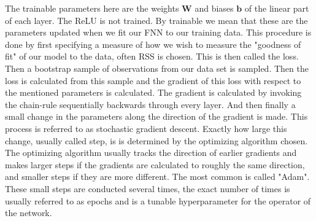 \documentclass[nofootinbib,UKenglish,nobalancelastpage,12pt]{article}
\begin{document}
\clearpage
The trainable parameters here are the weights $\textbf{W}$ and biases $\textbf{b}$ of the linear part of each layer. The ReLU is not trained. By trainable we mean that these are the parameters updated when we fit our FNN to our training data. This procedure is done by first specifying a measure of how we wish to measure the "goodness of fit" of our model to the data, often RSS is chosen. This is then called the loss. Then a bootstrap sample of observations from our data set is sampled. Then the loss is calculated from this sample and the gradient of this loss with respect to the mentioned parameters is calculated. The gradient is calculated by invoking the chain-rule sequentially backwards through every layer. And then finally a small change in the parameters along the direction of the gradient is made. This process is referred to as stochastic gradient descent. \cite{Robbins1951} Exactly how large this change, usually called step, is is determined by the optimizing algorithm chosen. The optimizing algorithm usually tracks the direction of earlier gradients and makes larger steps if the gradients are calculated to roughly the same direction, and smaller steps if they are more different. The most common is called "Adam". \cite{Adam} These small steps are conducted several times, the exact number of times is usually referred to as epochs and is a tunable hyperparameter for the operator of the network.

\clearpage
\end{document}
